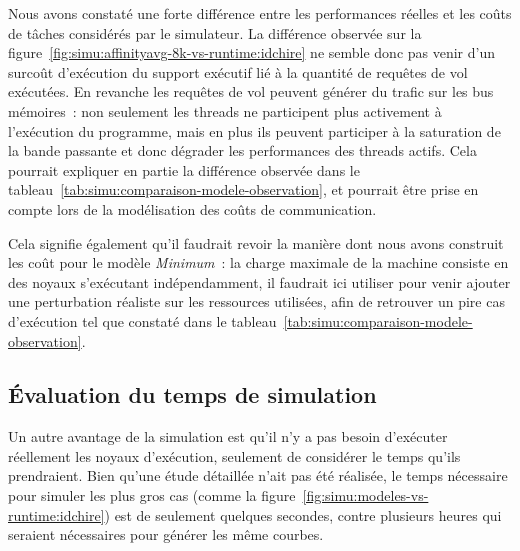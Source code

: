 Nous avons constaté une forte différence entre les performances réelles et les coûts de tâches considérés par le simulateur.
La différence observée sur la figure~\ref{fig:simu:affinityavg-8k-vs-runtime:idchire} ne semble donc pas venir d'un surcoût d'exécution du support exécutif lié à la quantité de requêtes de vol exécutées.
En revanche les requêtes de vol peuvent générer du trafic sur les bus mémoires~: non seulement les threads ne participent plus activement à l'exécution du programme, mais en plus ils peuvent participer à la saturation de la bande passante et donc dégrader les performances des threads actifs.
Cela pourrait expliquer en partie la différence observée dans le tableau~\ref{tab:simu:comparaison-modele-observation}, et pourrait être prise en compte lors de la modélisation des coûts de communication.

Cela signifie également qu'il faudrait revoir la manière dont nous avons construit les coût pour le modèle \emph{Minimum}~: la charge maximale de la machine consiste en des noyaux s'exécutant indépendamment, il faudrait ici utiliser \outil pour venir ajouter une perturbation réaliste sur les ressources utilisées, afin de retrouver un pire cas d'exécution tel que constaté dans le tableau~\ref{tab:simu:comparaison-modele-observation}.

\subsection*{Évaluation du temps de simulation}

Un autre avantage de la simulation est qu'il n'y a pas besoin d'exécuter réellement les noyaux d'exécution, seulement de considérer le temps qu'ils prendraient.
Bien qu'une étude détaillée n'ait pas été réalisée, le temps nécessaire pour simuler les plus gros cas (comme la figure~\ref{fig:simu:modeles-vs-runtime:idchire}) est de seulement quelques secondes, contre plusieurs heures qui seraient nécessaires pour générer les même courbes.






